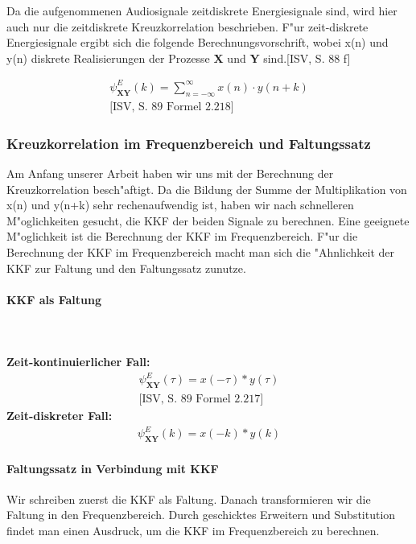 \noindent Da die aufgenommenen Audiosignale zeitdiskrete Energiesignale sind, wird hier auch nur die zeitdiskrete Kreuzkorrelation beschrieben. F"ur zeit-diskrete Energiesignale ergibt sich die folgende Berechnungsvorschrift, wobei x(n) und y(n) diskrete Realisierungen der Prozesse \textbf{X} und \textbf{Y} sind.[ISV, S. 88 f]

\begin{align}
\boxed{\psi_{\textbf {XY}}^E(k) = \sum_{n = -\infty}^{\infty} x(n) \cdot y(n+k)}\\\text{[ISV, S. 89 Formel 2.218]}
\end{align}

\subsubsection{Kreuzkorrelation im Frequenzbereich und Faltungssatz}
Am Anfang unserer Arbeit haben wir uns mit der Berechnung der Kreuzkorrelation besch"aftigt. Da die Bildung der Summe der Multiplikation von x(n) und y(n+k) sehr rechenaufwendig ist, haben wir nach schnelleren M"oglichkeiten gesucht, die KKF der beiden Signale zu berechnen. Eine geeignete M"oglichkeit ist die Berechnung der KKF im Frequenzbereich. F"ur die Berechnung der KKF im Frequenzbereich macht man sich die "Ahnlichkeit der KKF zur Faltung und den Faltungssatz zunutze.

\paragraph{KKF als Faltung}\textbf{\\\\Zeit-kontinuierlicher Fall:}
\begin{align}
\psi_{\textbf {XY}}^E(\tau) = x(-\tau) * y(\tau)\\\text{[ISV, S. 89 Formel 2.217]}
\end{align}
\textbf{Zeit-diskreter Fall:}
\begin{align}
\psi_{\textbf {XY}}^E(k) = x(-k) * y(k)
\end{align}
\paragraph{Faltungssatz in Verbindung mit KKF}Wir schreiben zuerst die KKF als Faltung. Danach transformieren wir die Faltung in den Frequenzbereich. Durch geschicktes Erweitern und Substitution findet man einen Ausdruck, um die KKF im Frequenzbereich zu berechnen.

